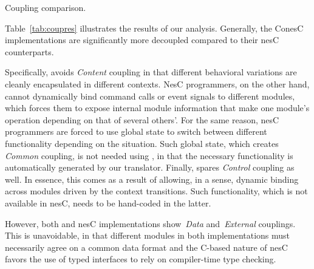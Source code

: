 \begin{table}[!tb]
\renewcommand{\arraystretch}{1.3}
\caption{Coupling comparison.}
\label{tab:coupres}

\end{table}

 Table~\ref{tab:coupres} illustrates the results of our analysis. Generally,
the ConesC implementations are significantly more decoupled compared
to their nesC counterparts.

Specifically, \conesc avoids \emph{Content} coupling in that different
behavioral variations are cleanly encapsulated in different
contexts. NesC programmers, on the other hand, cannot dynamically bind
command calls or event signals to different modules, which forces them
to expose internal module information that make one module's operation
depending on that of several others'. For the same reason, nesC
programmers are forced to use global state to switch between different
functionality depending on the situation. Such global state, which
creates \emph{Common} coupling, is not needed using \conesc, in that
the necessary functionality is automatically generated by our
translator. Finally, \conesc spares \emph{Control} coupling as
well. In essence, this comes as a result of allowing, in a sense,
dynamic binding across modules driven by the context transitions. Such
functionality, which is not available in nesC, needs to be hand-coded
in the latter.




However, both \conesc and nesC implementations show~\emph{Data}
and~\emph{External} couplings. This is unavoidable, in that different
modules in both implementations must necessarily agree on a common
data format and the C-based nature of nesC favors the use of typed
interfaces to rely on compiler-time type checking.


